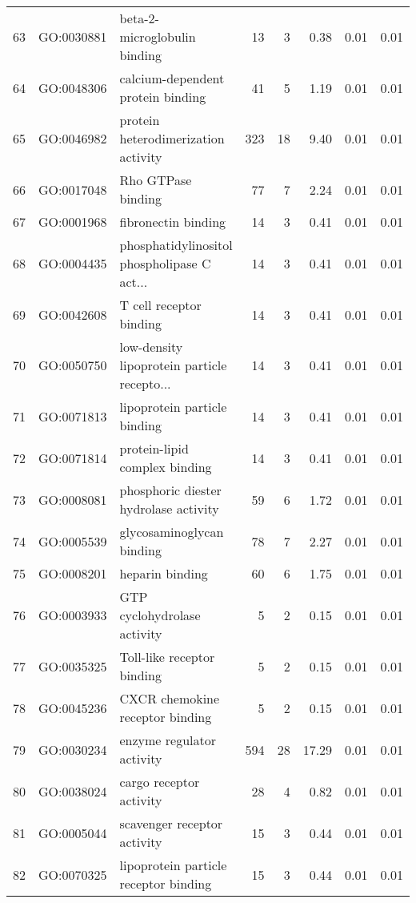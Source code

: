 \begin{table}[ht]
\begin{tabular}{rllrrrrr}
  63 & GO:0030881 & beta-2-microglobulin binding &  13 &   3 & 0.38 & 0.01 & 0.01 \\ 
  64 & GO:0048306 & calcium-dependent protein binding &  41 &   5 & 1.19 & 0.01 & 0.01 \\ 
  65 & GO:0046982 & protein heterodimerization activity & 323 &  18 & 9.40 & 0.01 & 0.01 \\ 
  66 & GO:0017048 & Rho GTPase binding &  77 &   7 & 2.24 & 0.01 & 0.01 \\ 
  67 & GO:0001968 & fibronectin binding &  14 &   3 & 0.41 & 0.01 & 0.01 \\ 
  68 & GO:0004435 & phosphatidylinositol phospholipase C act... &  14 &   3 & 0.41 & 0.01 & 0.01 \\ 
  69 & GO:0042608 & T cell receptor binding &  14 &   3 & 0.41 & 0.01 & 0.01 \\ 
  70 & GO:0050750 & low-density lipoprotein particle recepto... &  14 &   3 & 0.41 & 0.01 & 0.01 \\ 
  71 & GO:0071813 & lipoprotein particle binding &  14 &   3 & 0.41 & 0.01 & 0.01 \\ 
  72 & GO:0071814 & protein-lipid complex binding &  14 &   3 & 0.41 & 0.01 & 0.01 \\ 
  73 & GO:0008081 & phosphoric diester hydrolase activity &  59 &   6 & 1.72 & 0.01 & 0.01 \\ 
  74 & GO:0005539 & glycosaminoglycan binding &  78 &   7 & 2.27 & 0.01 & 0.01 \\ 
  75 & GO:0008201 & heparin binding &  60 &   6 & 1.75 & 0.01 & 0.01 \\ 
  76 & GO:0003933 & GTP cyclohydrolase activity &   5 &   2 & 0.15 & 0.01 & 0.01 \\ 
  77 & GO:0035325 & Toll-like receptor binding &   5 &   2 & 0.15 & 0.01 & 0.01 \\ 
  78 & GO:0045236 & CXCR chemokine receptor binding &   5 &   2 & 0.15 & 0.01 & 0.01 \\ 
  79 & GO:0030234 & enzyme regulator activity & 594 &  28 & 17.29 & 0.01 & 0.01 \\ 
  80 & GO:0038024 & cargo receptor activity &  28 &   4 & 0.82 & 0.01 & 0.01 \\ 
  81 & GO:0005044 & scavenger receptor activity &  15 &   3 & 0.44 & 0.01 & 0.01 \\ 
  82 & GO:0070325 & lipoprotein particle receptor binding &  15 &   3 & 0.44 & 0.01 & 0.01 \\ 
   \hline
\end{tabular}
\end{table}
